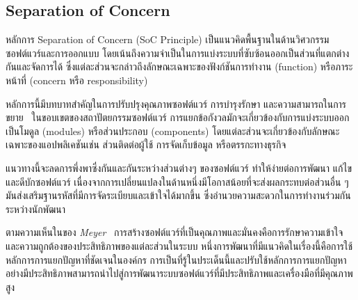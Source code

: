 \documentclass[12pt,oneside,openright,a4paper]{cpe-thai-project}
\begin{document}
    \subsection{Separation of Concern}
        \begin{flushleft}
        หลักการ Separation of Concern (SoC Principle) เป็นแนวคิดพื้นฐานในด้านวิศวกรรมซอฟต์แวร์และการออกแบบ โดยเน้นถึงความจำเป็นในการแบ่งระบบที่ซับซ้อนออกเป็นส่วนที่แตกต่างกันและจัดการได้ ซึ่งแต่ละส่วนจะกล่าวถึงลักษณะเฉพาะของฟังก์ชันการทำงาน (function) หรือภาระหน้าที่ (concern หรือ responsibility)~\cite{nattawat20}
        \end{flushleft}
        \begin{flushleft}
        หลักการนี้มีบทบาทสำคัญในการปรับปรุงคุณภาพซอฟต์แวร์ การบำรุงรักษา และความสามารถในการขยาย~\cite{dijkstra82} ในขอบเขตของสถาปัตยกรรมซอฟต์แวร์ การแยกข้อกังวลมักจะเกี่ยวข้องกับการแบ่งระบบออกเป็นโมดูล (modules) หรือส่วนประกอบ (components) โดยแต่ละส่วนจะเกี่ยวข้องกับลักษณะเฉพาะของแอปพลิเคชันเช่น ส่วนติดต่อผู้ใช้ การจัดเก็บข้อมูล หรือตรรกะทางธุรกิจ
        \end{flushleft}
        แนวทางนี้จะลดการพึ่งพาซึ่งกันและกันระหว่างส่วนต่างๆ ของซอฟต์แวร์ ทำให้ง่ายต่อการพัฒนา แก้ไข และดีบักซอฟต์แวร์ เนื่องจากการเปลี่ยนแปลงในด้านหนึ่งมีโอกาสน้อยที่จะส่งผลกระทบต่อส่วนอื่น ๆ มันส่งเสริมฐานรหัสที่มีการจัดระเบียบและเข้าใจได้มากขึ้น ซึ่งอำนวยความสะดวกในการทำงานร่วมกันระหว่างนักพัฒนา
        \begin{flushleft}
        ตามความเห็นในของ \textit{Meyer}~\cite{meyer88} การสร้างซอฟต์แวร์ที่เป็นคุณภาพและมั่นคงคือการรักษาความเข้าใจและความถูกต้องของประสิทธิภาพของแต่ละส่วนในระบบ หนึ่งการพัฒนาที่มีแนวคิดในเรื่องนี้คือการใช้หลักการการแยกปัญหาที่ชัดเจนในองค์กร การเป็นที่รู้ในประเด็นนี้และปรับใช้หลักการการแยกปัญหาอย่างมีประสิทธิภาพสามารถนำไปสู่การพัฒนาระบบซอฟต์แวร์ที่มีประสิทธิภาพและเครื่องมือที่มีคุณภาพสูง
        \end{flushleft}
    
\end{document}
